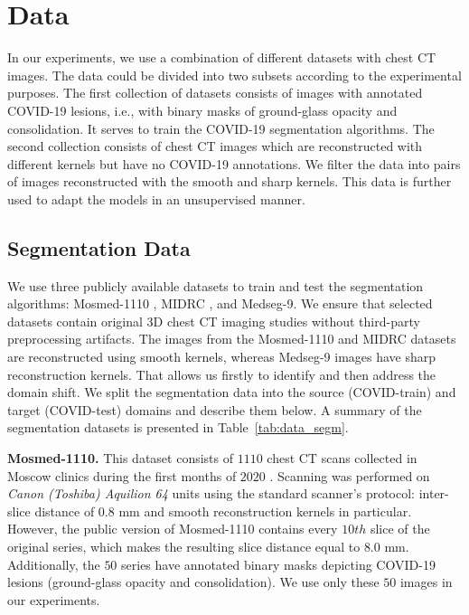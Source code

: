 \section{Data}

In our experiments, we use a combination of different datasets with chest CT images. The data could be divided into two subsets according to the experimental purposes. The first collection of datasets consists of images with annotated COVID-19 lesions, i.e., with binary masks of ground-glass opacity and consolidation. It serves to train the COVID-19 segmentation algorithms. The second collection consists of chest CT images which are reconstructed with different kernels but have no COVID-19 annotations. We filter the data into pairs of images reconstructed with the smooth and sharp kernels. This data is further used to adapt the models in an unsupervised manner.


\subsection{Segmentation Data}

We use three publicly available datasets to train and test the segmentation algorithms: Mosmed-1110 \cite{morozov2020mosmeddata}, MIDRC \cite{tsai2021rsna}, and Medseg-9. We ensure that selected datasets contain original 3D chest CT imaging studies without third-party preprocessing artifacts. The images from the Mosmed-1110 and MIDRC datasets are reconstructed using smooth kernels, whereas Medseg-9 images have sharp reconstruction kernels. That allows us firstly to identify and then address the domain shift. We split the segmentation data into the source (COVID-train) and target (COVID-test) domains and describe them below. A summary of the segmentation datasets is presented in Table~\ref{tab:data_segm}.



\textbf{Mosmed-1110.} This dataset consists of $1110$ chest CT scans collected in Moscow clinics during the first months of $2020$ \cite{morozov2020mosmeddata}. Scanning was performed on \textit{Canon (Toshiba) Aquilion 64} units using the standard scanner's protocol: inter-slice distance of $0.8$ mm and smooth reconstruction kernels in particular. However, the public version of Mosmed-1110 contains every $10th$ slice of the original series, which makes the resulting slice distance equal to $8.0$ mm. Additionally, the $50$ series have annotated binary masks depicting COVID-19 lesions (ground-glass opacity and consolidation). We use only these $50$ images in our experiments.


